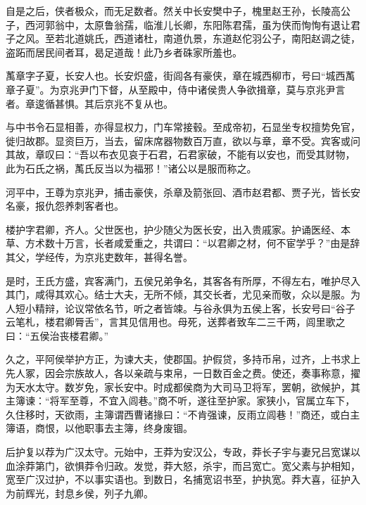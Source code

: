 \documentclass[12pt,UTF8]{ctexbook}
\begin{document}
自是之后，侠者极众，而无足数者。然关中长安樊中子，槐里赵王孙，长陵高公子，西河郭翁中，太原鲁翁孺，临淮儿长卿，东阳陈君孺，虽为侠而恂恂有退让君子之风。至若北道姚氏，西道诸杜，南道仇景，东道赵佗羽公子，南阳赵调之徒，盗跖而居民间者耳，曷足道哉！此乃乡者硃家所羞也。



萭章字子夏，长安人也。长安炽盛，街闾各有豪侠，章在城西柳市，号曰“城西萭章子夏”。为京兆尹门下督，从至殿中，侍中诸侯贵人争欲揖章，莫与京兆尹言者。章逡循甚惧。其后京兆不复从也。



与中书令石显相善，亦得显权力，门车常接毂。至成帝初，石显坐专权擅势免官，徙归故郡。显资巨万，当去，留床席器物数百万直，欲以与章，章不受。宾客或问其故，章叹曰：“吾以布衣见哀于石君，石君家破，不能有以安也，而受其财物，此为石氏之祸，萭氏反当以为福邪！”诸公以是服而称之。



河平中，王尊为京兆尹，捕击豪侠，杀章及箭张回、酒市赵君都、贾子光，皆长安名豪，报仇怨养刺客者也。



楼护字君卿，齐人。父世医也，护少随父为医长安，出入贵戚家。护诵医经、本草、方术数十万言，长者咸爱重之，共谓曰：“以君卿之材，何不宦学乎？”由是辞其父，学经传，为京兆吏数年，甚得名誉。



是时，王氏方盛，宾客满门，五侯兄弟争名，其客各有所厚，不得左右，唯护尽入其门，咸得其欢心。结士大夫，无所不倾，其交长者，尤见亲而敬，众以是服。为人短小精辩，论议常依名节，听之者皆竦。与谷永俱为五侯上客，长安号曰“谷子云笔札，楼君卿脣舌”，言其见信用也。母死，送葬者致车二三千两，闾里歌之曰：“五侯治丧楼君卿。”



久之，平阿侯举护方正，为谏大夫，使郡国。护假贷，多持币帛，过齐，上书求上先人冢，因会宗族故人，各以亲疏与束帛，一日数百金之费。使还，奏事称意，擢为天水太守。数岁免，家长安中。时成都侯商为大司马卫将军，罢朝，欲候护，其主簿谏：“将军至尊，不宜入闾巷。”商不听，遂往至护家。家狭小，官属立车下，久住移时，天欲雨，主簿谓西曹诸掾曰：“不肯强谏，反雨立闾巷！”商还，或白主簿语，商恨，以他职事去主簿，终身废锢。



后护复以荐为广汉太守。元始中，王莽为安汉公，专政，莽长子宇与妻兄吕宽谋以血涂莽第门，欲惧莽令归政。发觉，莽大怒，杀宇，而吕宽亡。宽父素与护相知，宽至广汉过护，不以事实语也。到数日，名捕宽诏书至，护执宽。莽大喜，征护入为前辉光，封息乡侯，列子九卿。
\end{document}

